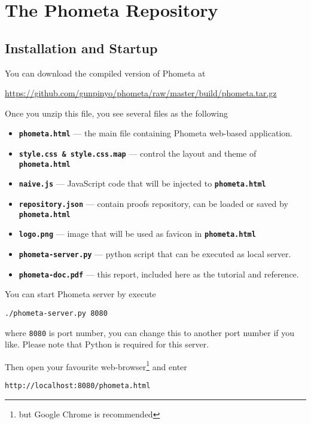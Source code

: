 \documentclass[master.tex]{subfiles}
\begin{document}
\chapter{The Phometa Repository}
\label{chap:code_repository}

\section{Installation and Startup}
\label{sec:installation_startup}

You can download the compiled version of Phometa at

{\centering\url{https://github.com/gunpinyo/phometa/raw/master/build/phometa.tar.gz}}

Once you unzip this file, you see several files as the following

\begin{itemize}
\item \texttt{\textbf{phometa.html}} --- the main file containing Phometa
  web-based application.
\item \texttt{\textbf{style.css \& style.css.map}} --- control the layout and
  theme of \texttt{\textbf{phometa.html}}
\item \texttt{\textbf{naive.js}} --- JavaScript code that will be injected to
  \texttt{\textbf{phometa.html}}
\item \texttt{\textbf{repository.json}} --- contain proofs repository, can be
  loaded or saved by \texttt{\textbf{phometa.html}}
\item \texttt{\textbf{logo.png}} --- image that will be used as favicon in
  \texttt{\textbf{phometa.html}}
\item \texttt{\textbf{phometa-server.py}} --- python script that can be executed
  as local server.
\item \texttt{\textbf{phometa-doc.pdf}} --- this report, included here as the
  tutorial and reference.
\end{itemize}

You can start Phometa server by execute

\texttt{./phometa-server.py 8080}

where \texttt{8080} is port number, you can change this to another port number
if you like. Please note that Python is required for this server.

Then open your favourite web-browser\footnote{but Google Chrome is recommended}
and enter

\texttt{http://localhost:8080/phometa.html}
\end{document}
